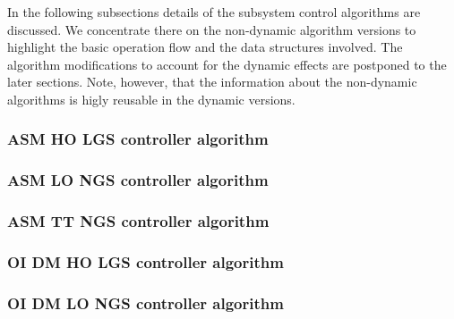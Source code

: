 In the following subsections details of the subsystem control algorithms are
discussed. We concentrate there on the non-dynamic algorithm versions to
highlight the basic operation flow and the data structures involved. The
algorithm modifications to account for the dynamic effects are postponed to
the later sections. Note, however, that the information about the non-dynamic
algorithms is higly reusable in the dynamic versions.


\subsubsection{ASM HO LGS controller algorithm}



\subsubsection{ASM LO NGS controller algorithm}
\subsubsection{ASM TT NGS controller algorithm}
\subsubsection{OI DM HO LGS controller algorithm}
\subsubsection{OI DM LO NGS controller algorithm}

